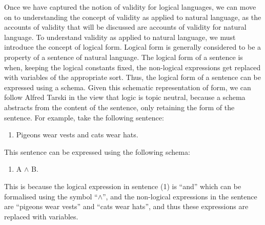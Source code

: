 Once we have captured the notion of validity for logical languages, we
can move on to understanding the concept of validity as applied to
natural language, as the accounts of validity that will be discussed are
accounts of validity for natural language. To understand validity as
applied to natural language, we must introduce the concept of logical
form. Logical form is generally considered to be a property of a
sentence of natural language. The logical form of a sentence is when,
keeping the logical constants fixed, the non-logical expressions get
replaced with variables of the appropriate sort. Thus, the logical form
of a sentence can be expressed using a schema. Given this schematic
representation of form, we can follow Alfred Tarski in the view that
logic is topic neutral, because a schema abstracts from the content of
the sentence, only retaining the form of the sentence. For example, take
the following sentence:

\begin{enumerate}[leftmargin=42] 
\def\labelenumi{(\arabic{enumi})}
\item
  Pigeons wear vests and cats wear hats.
\end{enumerate}

\noindent This sentence can be expressed using the following schema:

\begin{enumerate}[leftmargin=42] 
\def\labelenumi{(\arabic{enumi})}
\setcounter{enumi}{1}
\item
  A $\land$ B.
\end{enumerate}

\noindent This is because the logical expression in sentence (1) is ``and'' which
can be formalised using the symbol ``$\land$'', and the non-logical
expressions in the sentence are ``pigeons wear vests'' and ``cats wear
hats'', and thus these expressions are replaced with variables.

